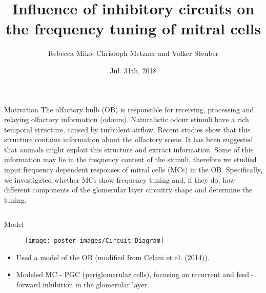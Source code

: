 \documentclass[final,hyperref={pdfpagelabels=false}]{beamer}
\title{Influence of inhibitory circuits on the frequency tuning of mitral cells}
\author[Miko]{Rebecca Miko, Christoph Metzner and Volker Steuber}
\institute{University of Hertfordshire, AL10 9AB, UK}
\date{Jul. 31th, 2018}
\begin{document}
\begin{frame}{} 
\begin{block}{Motivation}
The olfactory bulb (OB) is responsible for receiving, processing and relaying olfactory information (odours). 
Naturalistic odour stimuli have a rich temporal structure, caused by turbulent airflow.
Recent studies show that this structure contains information about the olfactory scene. 
It has been suggested that animals might exploit this structure and extract information. 
Some of this information may lie in the frequency content of the stimuli, therefore we studied input frequency dependent responses of mitral cells (MCs) in the OB.
Specifically, we investigated whether MCs show frequency tuning and, if they do, how different components of the glomerular layer circuitry  shape and determine the tuning.
\end{block}    

\begin{columns}[t]
\begin{column}{.48\linewidth}

\begin{block}{Model} 
\begin{figure}
\center
\texttt{[image: poster\_images/Circuit\_Diagram]}
\end{figure}
\begin{itemize}
\item Used a model of the OB (modified from Celani et al. (2014)).
\item Modeled MC - PGC (periglomerular cells), focusing on recurrent and feed - forward inhibition in the glomerular layer.
\end{itemize}
\end{block}


\end{column}
\end{columns}
\end{frame}
\end{document}
